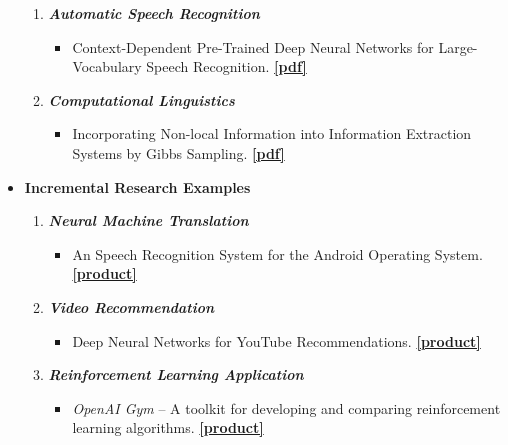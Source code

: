 \documentclass[12pt]{article}
\numberwithin{equation}{section}
\numberwithin{table}{section}
\numberwithin{figure}{section}
\begin{document}
\begin{itemize}
\begin{enumerate}
			\item{\textit{\textbf{Automatic Speech Recognition}}}
			\begin{itemize}
				\item{Context-Dependent Pre-Trained Deep Neural
					Networks for Large-Vocabulary Speech Recognition.}
				\href{https://s3.amazonaws.com/academia.edu.documents/34691735/dbn4lvcsr-transaslp.pdf?AWSAccessKeyId=AKIAIWOWYYGZ2Y53UL3A&Expires=1518784696&Signature=nX6mYsYa6RxXSkPq1y8x3VnL0po\%3D&response-content-disposition=inline\%3B\%20filename\%3DContext-Dependent_Pre-Trained_Deep_Neura.pdf}{\textbf{[pdf]}}
			\end{itemize}
			\item{\textit{\textbf{Computational Linguistics}}}
			\begin{itemize}
				\item{Incorporating Non-local Information into Information Extraction Systems by Gibbs Sampling.}
				\href{http://www.aclweb.org/anthology/P05-1045}{\textbf{[pdf]}}
			\end{itemize}
		\end{enumerate}
	
	\item{\textbf{Incremental Research Examples}}
		\begin{enumerate}
			\item{\textit{\textbf{Neural Machine Translation}}}
			\begin{itemize}
				\item{An Speech Recognition System for the Android Operating System.}
				\href{https://en.wikipedia.org/wiki/Google_Assistant}{\textbf{[product]}}
			\end{itemize}
			
			\item{\textit{\textbf{Video Recommendation}}}
			\begin{itemize}
				\item{Deep Neural Networks for YouTube Recommendations.}
				\href{https://static.googleusercontent.com/media/research.google.com/en//pubs/archive/45530.pdf}{\textbf{[product]}}
			\end{itemize}
			\item{\textit{\textbf{Reinforcement Learning Application}}}
			\begin{itemize}
				\item{\textit{OpenAI Gym} -- A toolkit for developing and comparing reinforcement learning algorithms.}
				\href{https://github.com/openai/gym}{\textbf{[product]}}
			\end{itemize}
		\end{enumerate}
	
\end{itemize}
\end{document}
